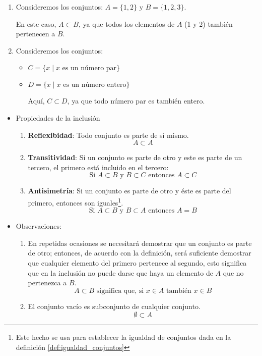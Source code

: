 \begin{fmd-example}[Inclusión]
	\begin{enumerate}
		\item Consideremos los conjuntos: \(A = \{1, 2\}\) y \(B = \{1, 2, 3\}\).
		
		En este caso, \(A \subset B\), ya que todos los elementos de \(A\) (1 y 2) también pertenecen a \(B\).
		
		\item Consideremos los conjuntos:
		
		\begin{itemize}
			\item \(C = \{x \mid x \mbox{ es un número par}\}\)
			\item \(D = \{x \mid x \mbox{ es un número entero}\}\)
			
			Aquí, \(C \subset D\), ya que todo número par es también entero.
		\end{itemize}
	\end{enumerate}
\end{fmd-example}


\begin{itemize}
	\item Propiedades de la inclusión
	\begin{enumerate}[label=\roman*)]
		\item \textbf{Reflexibidad}: Todo conjunto es parte de sí mismo.
		\[ A \subset A \]
		\item \textbf{Transitividad}: Si un conjunto es parte de otro y este es parte de un tercero, el primero está incluido en el tercero:
		\[\mbox{Si } A \subset B \mbox{ y } B \subset C \mbox{ entonces } A \subset C \]
		\item \textbf{Antisimetría}: Si un conjunto es parte de otro y éste es parte del primero, entonces son iguales\footnote{Este hecho se usa para establecer la igualdad de conjuntos dada en la definición \ref{def:igualdad_conjuntos}}.
		\[\mbox{Si } A \subset B \mbox{ y } B \subset A \mbox{ entonces } A = B \]
	\end{enumerate}
	
	\item Observaciones:
	
	\begin{enumerate}
		\item En repetidas ocasiones se necesitará demostrar que un conjunto es parte de otro; entonces, de acuerdo con la definición, será suficiente demostrar que cualquier elemento del primero pertenece al segundo, esto significa que en la inclusión no puede darse que haya un elemento de $A$ que no pertenezca a $B$.
		\[A \subset B \mbox{ significa que, si } x \in A \mbox{ también } x \in B \]
		
		\item El conjunto vacío es subconjunto de cualquier conjunto.
		\[ \emptyset \subset A \]
	\end{enumerate}
\end{itemize}

